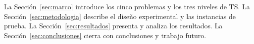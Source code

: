 La Sección~\ref{sec:marco} introduce los cinco problemas y los tres niveles
de TS.
La Sección~\ref{sec:metodologia} describe el diseño experimental y las
instancias de prueba.
La Sección~\ref{sec:resultados} presenta y analiza los resultados.
La Sección~\ref{sec:conclusiones} cierra con conclusiones y trabajo futuro.
